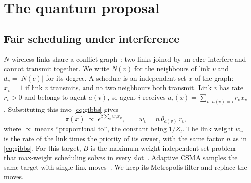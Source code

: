 \documentclass[11pt,a4paper]{article}
\begin{document}
\section{The quantum proposal}\label{sec:quantum}

\subsection{Fair scheduling under interference}
$N$ wireless links share a conflict graph~\cite{jain2003impact}: two links joined by an edge interfere
and cannot transmit together. We write $N(v)$ for the neighbours of link $v$ and $d_v=|N(v)|$ for its
degree. A schedule is an independent set $x$ of the graph: $x_v=1$ if link $v$ transmits, and no two
neighbours both transmit. Link $v$ has rate $r_v>0$ and belongs to agent $a(v)$, so agent $i$ receives
$u_i(x)=\sum_{v:\,a(v)=i}r_vx_v$. Substituting this into \eqref{eq:gibbs} gives
\begin{equation}\label{eq:target}
\pi(x)\;\propto\;e^{\beta\sum_vw_vx_v},\qquad w_v=n\,\theta_{a(v)}\,r_v ,
\end{equation}
where $\propto$ means ``proportional to'', the constant being $1/Z_t$. The link weight $w_v$ is the
rate of the link times the priority of its owner, with the same factor $n$ as in \eqref{eq:gibbs}. For
this target, $B$ is the maximum-weight independent set problem that max-weight scheduling solves in
every slot~\cite{tassiulas1992stability}. Adaptive CSMA samples the same target with single-link
moves~\cite{jiang2010distributed}. We keep its Metropolis filter and replace the moves.
\end{document}

